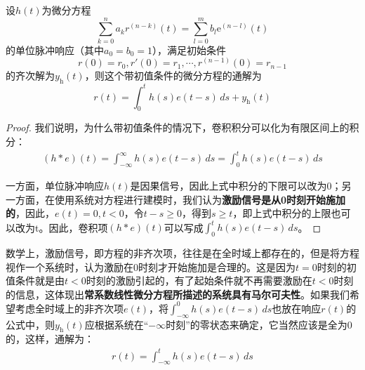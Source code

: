 \begin{theorem}
    设$h(t)$为微分方程
    \[\sum_{k=0}^{n}a_{k} r^{(n-k)}(t)=\sum_{l=0}^{m}b_{l} \mathrm{e}^{(n-l)}(t)\]
    的单位脉冲响应（其中$a_0=b_0=1$），满足初始条件
    $$r(0)=r_0,r'(0)=r_1,\cdots,r^{(n-1)}(0)=r_{n-1}$$
    的齐次解为$y_{\text{h}}(t)$，则这个带初值条件的微分方程的通解为
    \[r(t)=\int_{0}^{t}h(s)e(t-s)\,ds + y_{\text{h}}(t)\]
\end{theorem}
\begin{proof}
    我们说明，为什么带初值条件的情况下，卷积积分可以化为有限区间上的积分：
    \begin{align*}
        (h*e)(t)=\int_{-\infty}^{\infty} h(s)e(t-s)\,ds=\int_{0}^{t} h(s)e(t-s)\,ds
    \end{align*}

    一方面，单位脉冲响应$h(t)$是因果信号，因此上式中积分的下限可以改为0；另一方面，在使用系统对方程进行建模时，我们认为\textbf{激励信号是从0时刻开始施加的}，因此，$e(t)=0,t<0$，令$t-s\geq 0$，得到$s\geq t$，即上式中积分的上限也可以改为t。因此，卷积项$(h*e)(t)$可以写成$\int_{0}^{t} h(s)e(t-s)\,ds$。
\end{proof}

数学上，激励信号，即方程的非齐次项，往往是在全时域上都存在的，但是将方程视作一个系统时，认为激励在0时刻才开始施加是合理的。这是因为$t=0$时刻的初值条件就是由$t<0$时刻的激励引起的，有了起始条件就不再需要激励在$t<0$时刻的信息，这体现出\textbf{常系数线性微分方程所描述的系统具有马尔可夫性}。如果我们希望考虑全时域上的非齐次项$e(t)$，将$\int_{-\infty}^0 h(s)e(t-s)\,ds$也放在响应$r(t)$的公式中，则$y_{\text{h}}(t)$应根据系统在“$-\infty$时刻”的零状态来确定，它当然应该是全为0的，这样，通解为：
\begin{align*}
    r(t)=\int_{-\infty}^{t} h(s)e(t-s)\,ds
\end{align*}
